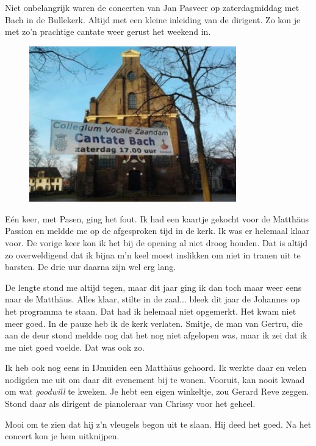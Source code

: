 \documentclass[12pt,twoside, openright]{memoir}
\begin{document}
Niet onbelangrijk waren de concerten van Jan Pasveer op zaterdagmiddag met Bach in de Bullekerk. Altijd met een kleine inleiding van de dirigent. Zo kon je met zo’n prachtige cantate weer gerust het weekend in.

\begin{figure}
\centering
\includegraphics[width=0.8\textwidth]{img/ch31/Spandoek-cantate-klein}
\end{figure}

Eén keer, met Pasen, ging het fout. Ik had een kaartje gekocht voor de Matthäus Passion en meldde me op de afgesproken tijd in de kerk. Ik was er helemaal klaar voor. De vorige keer kon ik het bij de opening al niet droog houden. Dat is altijd zo overweldigend dat ik bijna m’n keel moest inslikken om niet in tranen uit te barsten. De drie uur daarna zijn wel erg lang. 

De lengte stond me altijd tegen, maar dit jaar ging ik dan toch maar weer eens naar de Matthäus. Alles klaar, stilte in de zaal... bleek dit jaar de Johannes op het programma te staan. Dat had ik helemaal niet opgemerkt. Het kwam niet meer goed. In de pauze heb ik de kerk verlaten. Smitje, de man van Gertru, die aan de deur stond meldde nog dat het nog niet afgelopen was, maar ik zei dat ik me niet goed voelde. Dat was ook zo.

Ik heb ook nog eens in IJmuiden een Matthäus gehoord. Ik werkte daar en velen nodigden me uit om daar dit evenement bij te wonen. Vooruit, kan nooit kwaad om wat \emph{goodwill} te kweken. Je hebt een eigen winkeltje, zou Gerard Reve zeggen. Stond daar als dirigent de pianoleraar van Chrissy voor het geheel. 

Mooi om te zien dat hij z’n vleugels begon uit te slaan. Hij deed het goed. Na het concert kon je hem uitknijpen.  
\end{document}
